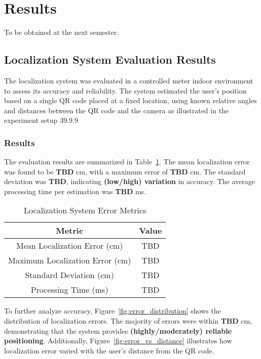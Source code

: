 \section{Results}
To be obtained at the next semester.




\subsection{Localization System Evaluation Results}

The localization system was evaluated in a controlled meter indoor environment to assess its accuracy and reliability. The system estimated the user’s position based on a single QR code placed at a fixed location, using known relative angles and distances between the QR code and the camera as illustrated in the experiment setup 39.9.9


\subsubsection*{Results}
The evaluation results are summarized in Table~\ref{tab:localization_results}. The mean localization error was found to be \textbf{TBD} cm, with a maximum error of \textbf{TBD} cm. The standard deviation was \textbf{TBD}, indicating \textbf{(low/high) variation} in accuracy. The average processing time per estimation was \textbf{TBD} ms.

\begin{table}[h]
	\centering
	\caption{Localization System Error Metrics}
	\label{tab:localization_results}
	\begin{tabular}{|c|c|}
		\hline
		\textbf{Metric} & \textbf{Value} \\ 
		\hline
		Mean Localization Error (cm) & TBD \\ 
		\hline
		Maximum Localization Error (cm) & TBD \\ 
		\hline
		Standard Deviation (cm) & TBD \\ 
		\hline
		Processing Time (ms) & TBD \\ 
		\hline
	\end{tabular}
\end{table}

To further analyze accuracy, Figure~\ref{fig:error_distribution} shows the distribution of localization errors. The majority of errors were within \textbf{TBD} cm, demonstrating that the system provides \textbf{(highly/moderately) reliable positioning}. Additionally, Figure~\ref{fig:error_vs_distance} illustrates how localization error varied with the user’s distance from the QR code.

